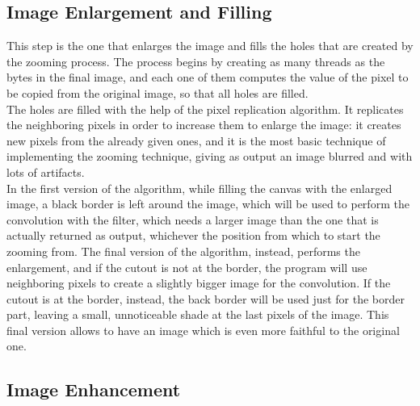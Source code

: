     \subsection{Image Enlargement and Filling}
    This step is the one that enlarges the image and fills the holes that are created by the zooming process.
    The process begins by creating as many threads as the bytes in the final image, and each one of them computes 
    the value of the pixel to be copied from the original image, so that all holes are filled.\\
    The holes are filled with the help of the pixel replication algorithm. 
    It replicates the neighboring pixels in order to increase them to enlarge the image: it creates new pixels from the already given ones, 
    and it is the most basic technique of implementing the zooming technique, giving as output an image blurred and with lots of artifacts.\\ 
    In the first version of the algorithm, while filling the canvas with the enlarged image, a black border is left around the image,
    which will be used to perform the convolution with the filter, which needs a larger image than the one that is actually returned as output, whichever
    the position from which to start the zooming from.
    The final version of the algorithm, instead, performs the enlargement, and if the cutout is not at the border, the program will use neighboring pixels
    to create a slightly bigger image for the convolution. If the cutout is at the border, instead, the back border will be used just for the border part, 
    leaving a small, unnoticeable shade at the last pixels of the image. This final version allows to have an image which is even more faithful to the original one.\\




    \subsection{Image Enhancement}

